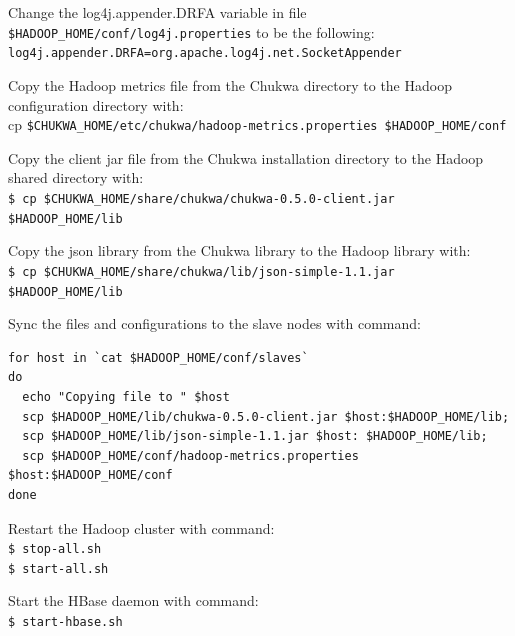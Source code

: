 Change the log4j.appender.DRFA variable in file \verb|$HADOOP_HOME/conf/log4j.properties| to be the following: \\
\verb|log4j.appender.DRFA=org.apache.log4j.net.SocketAppender|

Copy the Hadoop metrics file from the Chukwa directory to the Hadoop configuration directory with: \\
cp \verb|$CHUKWA_HOME/etc/chukwa/hadoop-metrics.properties $HADOOP_HOME/conf|

Copy the client jar file from the Chukwa installation directory to the Hadoop shared directory with:\\
\verb|$ cp $CHUKWA_HOME/share/chukwa/chukwa-0.5.0-client.jar $HADOOP_HOME/lib|

Copy the json library from the Chukwa library to the Hadoop library with: \\
\verb|$ cp $CHUKWA_HOME/share/chukwa/lib/json-simple-1.1.jar $HADOOP_HOME/lib|

Sync the files and configurations to the slave nodes with command: 
\begin{verbatim}
for host in `cat $HADOOP_HOME/conf/slaves`
do
  echo "Copying file to " $host
  scp $HADOOP_HOME/lib/chukwa-0.5.0-client.jar $host:$HADOOP_HOME/lib;
  scp $HADOOP_HOME/lib/json-simple-1.1.jar $host: $HADOOP_HOME/lib;
  scp $HADOOP_HOME/conf/hadoop-metrics.properties $host:$HADOOP_HOME/conf
done
\end{verbatim}

Restart the Hadoop cluster with command: \\
\verb|$ stop-all.sh| \\
\verb|$ start-all.sh|

Start the HBase daemon with command: \\
\verb|$ start-hbase.sh|

